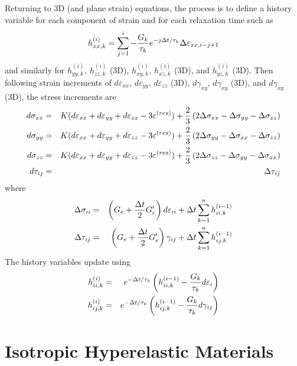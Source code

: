 \documentclass[11pt]{article}
\def\e#1{\varepsilon_{#1}}
\def\er#1{\varepsilon_{#1}^{(res)}}
\def\g#1{\gamma_{#1}}
\def\s#1{\sigma_{#1}}
\def\t#1{\tau_{#1}}
\begin{document}
Returning to 3D (and plane strain) equations, the process is to define a history variable for each component of strain and for each relaxation time such as
\begin{equation}
      h_{xx,k}^{(i)} = \sum_{j=1}^{i}  -{G_k\over\tau_k} e^{-j\Delta t/\tau_k}\Delta \e{xx,i-j+1}
\end{equation}
and similarly for $h_{yy,k}^{(i)}$,  $h_{zz,k}^{(i)}$ (3D), $h_{xy,k}^{(i)}$,  $h_{xz,k}^{(i)}$ (3D),  and $h_{yz,k}^{(i)}$ (3D). Then following strain increments of $d\e{xx}$, $d\e{yy}$,  $d\e{zz}$ (3D), $d\g{xy}$, $d\g{xy}$ (3D), and $d\g{xy}$ (3D), the stress increments are
\begin{eqnarray}
      d\s{xx} & = & K(d\e{xx} + d\e{yy} + d\e{zz} - 3\er{}) + {2\over 3}\left(2\Delta\s{xx} - \Delta\s{yy} - \Delta\s{zz}\right) \\
      d\s{yy} & = & K(d\e{xx} + d\e{yy} + d\e{zz} - 3\er{}) + {2\over 3}\left(2\Delta\s{yy} - \Delta\s{xx}- \Delta\s{zz}\right) \\
      d\s{zz} & = & K(d\e{xx} +d\e{yy} + d\e{zz} - 3\er{}) + {2\over 3}\left(2\Delta\s{zz} -\Delta\s{yy} - \Delta\s{xx}\right) \\
      d \t{ij} & = & \Delta\t{ij} 
\end{eqnarray}
where
\begin{eqnarray}
          \Delta \s{ii} & = & \left(G_e + {\Delta t\over 2}G_e'\right) d\e{ii}
                          + \Delta t  \sum_{k=1}^n h_{ii,k}^{(i-1)}     \\
          \Delta \t{ij} & = & \left(G_e + {\Delta t\over 2}G_e'\right) \g{ij}
                          + \Delta t  \sum_{k=1}^n h_{ij,k}^{(i-1)} 
\end{eqnarray}
The history variables update using
\begin{eqnarray}
        h_{ii,k}^{(i)}   & = & e^{-\Delta t/\tau_k}\left(h_{ii,k}^{(i-1)} - {G_k\over\tau_k}d\e{i}\right)  \\
        h_{ij,k}^{(i)}   & = & e^{-\Delta t/\tau_k}\left(h_{ij,k}^{(i-1)} - {G_k\over\tau_k}d\g{ij}\right)
\end{eqnarray}

\section{Isotropic Hyperelastic Materials}
\end{document}
